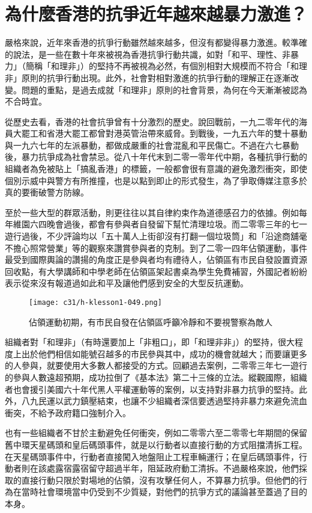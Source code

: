\section{為什麼香港的抗爭近年越來越暴力激進？}

嚴格來說，近年來香港的抗爭行動雖然越來越多，但沒有都變得暴力激進。較準確的說法，是一些在數十年來被視為香港抗爭行動共識，如對「和平、理性、非暴力」（簡稱「和理非」）的堅持不再被視為必然，有個別相對大規模而不符合「和理非」原則的抗爭行動出現。此外，社會對相對激進的抗爭行動的理解正在逐漸改變。問題的重點，是過去成就「和理非」原則的社會背景，為何在今天漸漸被認為不合時宜。

從歷史去看，香港的社會抗爭曾有十分激烈的歷史。說回戰前，一九二零年代的海員大罷工和省港大罷工都曾對港英管治帶來威脅。到戰後，一九五六年的雙十暴動與一九六七年的左派暴動，都做成嚴重的社會混亂和平民傷亡。不過在六七暴動後，暴力抗爭成為社會禁忌。從八十年代末到二零一零年代中期，各種抗爭行動的組織者為免被貼上「搞亂香港」的標籤，一般都會很有意識的避免激烈衝突，即使個別示威中與警方有所推撞，也是以點到即止的形式發生，為了爭取傳媒注意多於真的要衝破警方防線。

至於一些大型的群眾活動，則更往往以其自律約束作為道德感召力的依據。例如每年維園六四晚會過後，都會有參與者自發留下幫忙清理垃圾。而二零零三年的七一遊行過後，不少評論均以「五十萬人上街卻沒有打翻一個垃圾筒」和「沿途商舖毫不擔心照常營業」等的觀察來讚賞參與者的克制。到了二零一四年佔領運動，事件最受到國際輿論的讚揚的角度正是參與者均有禮待人，佔領區有市民自發設置資源回收點，有大學講師和中學老師在佔領區架起書桌為學生免費補習，外國記者紛紛表示從來沒有報道過如此和平及讓他們感到安全的大型反抗運動。

\begin{figure}[htbp]
    \centering
    \texttt{[image: c31/h-klesson1-049.png]}
    \caption{佔領運動初期，有市民自發在佔領區呼籲冷靜和不要視警察為敵人} 
\end{figure}

組織者對「和理非」（有時還要加上「非粗口」，即「和理非非」）的堅持，很大程度上出於他們相信如能號召越多的市民參與其中，成功的機會就越大；而要讓更多的人參與，就要使用大多數人都接受的方式。回顧過去案例，二零零三年七一遊行的參與人數遠超預期，成功拉倒了《基本法》第二十三條的立法。縱觀國際，組織者也會援引美國六十年代黑人平權運動等的案例，以支持對非暴力抗爭的堅持。此外，八九民運以武力鎮壓結束，也讓不少組織者深信要透過堅持非暴力來避免流血衝突，不給予政府籍口強制介入。

也有一些組織者不甘於主動避免任何衝突，例如二零零六至二零零七年期間的保留舊中環天星碼頭和皇后碼頭事件，就是以行動者以直接行動的方式阻擋清拆工程。在天星碼頭事件中，行動者直接闖入地盤阻止工程車輛運行；在皇后碼頭事件，行動者則在該處露宿露宿留守超過半年，阻延政府動工清拆。不過嚴格來說，他們採取的直接行動只限於對場地的佔領，沒有攻擊任何人，不算暴力抗爭。但他們的行為在當時社會環境當中仍受到不少質疑，對他們的抗爭方式的議論甚至蓋過了目的本身。

